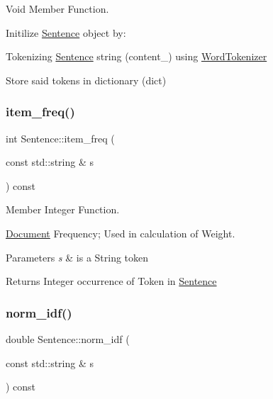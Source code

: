 Void Member Function. 

Initilize \hyperlink{class_sentence}{Sentence} object by\+:
\begin{DoxyItemize}
\item Tokenizing \hyperlink{class_sentence}{Sentence} string (content\+\_\+) using \hyperlink{class_word_tokenizer}{Word\+Tokenizer}
\item Store said tokens in dictionary (dict) 
\end{DoxyItemize}\mbox{\label{class_sentence_af3e48fa5d5776ae122b408191d67d327}} 
\subsubsection{\texorpdfstring{item\+\_\+freq()}{item\_freq()}}
{\footnotesize\ttfamily int Sentence\+::item\+\_\+freq (\begin{DoxyParamCaption}\item[{const std\+::string \&}]{s }\end{DoxyParamCaption}) const\hspace{0.3cm}{\ttfamily [private]}}



Member Integer Function. 

\hyperlink{class_document}{Document} Frequency; Used in calculation of Weight.


\begin{DoxyParams}{Parameters}
{\em s} & is a String token \\
\hline
\end{DoxyParams}
\begin{DoxyReturn}{Returns}
Integer occurrence of Token in \hyperlink{class_sentence}{Sentence} 
\end{DoxyReturn}
\mbox{\label{class_sentence_ac114a37a1f4c317f5141802d2d77b209}} 
\subsubsection{\texorpdfstring{norm\+\_\+idf()}{norm\_idf()}}
{\footnotesize\ttfamily double Sentence\+::norm\+\_\+idf (\begin{DoxyParamCaption}\item[{const std\+::string \&}]{s }\end{DoxyParamCaption}) const\hspace{0.3cm}{\ttfamily [private]}}




